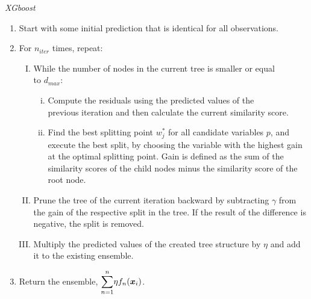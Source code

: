 \documentclass[a4paper,12pt, headsepline]{scrartcl}
\numberwithin{equation}{section}
\begin{document}
{\centering
	\begin{minipage}{.9\linewidth}
		\begin{algorithm}[H]
			\caption{\textit{XGboost}}\label{alg:two}
			\begin{enumerate}
				\item Start with some initial prediction that is identical for all observations.
				\item For $n_{iter}$ times, repeat:
				\begin{enumerate}[I.]
					\item While the number of nodes in the current tree is smaller or equal\\ to $d_ {max}$:
					\begin{enumerate}[i.]
						\item Compute the residuals using the predicted values of the\\ previous iteration and then calculate the current similarity score.
						\item Find the best splitting point $w^*_j$ for all candidate variables $p$, and execute the best split, by choosing the variable with the highest gain at the optimal splitting point. Gain is defined as the sum of the similarity scores of the child nodes minus the similarity score of the root node.
					\end{enumerate}
					\item Prune the tree of the current iteration backward by subtracting $\gamma$ from the gain of the respective split in the tree. If the result of the difference is negative, the split is removed.
					\item Multiply the predicted values of the created tree structure by $\eta$ and add it to the existing ensemble.
				\end{enumerate} 
				\item Return the ensemble, $\mathlarger{\sum}\limits_{n = 1}^{n} \eta f_{n}(\bm x_i)$.
			\end{enumerate}
		\end{algorithm}
	\end{minipage}
	\par
}
\end{document}
